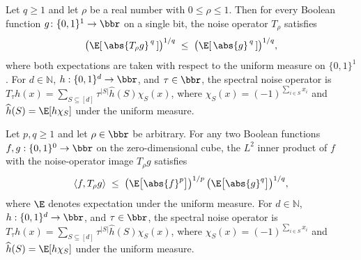 \begin{lemma}
\leanok
{}
\label{BooleanAnalysis.Hypercontractivity.noise_Lp_contraction_one_bit}
Let $q \ge 1$ and let $\rho$ be a real number with $0 \le \rho \le 1$. Then for every
Boolean function $g \colon \{0,1\}^1 \to \bbr$ on a single bit, the noise operator
$T_\rho$ satisfies
\[
  \bigl(\E\!\left[\,\abs{T_\rho g}^{\,q}\,\right]\bigr)^{1/q}
  \;\le\;
  \bigl(\E\!\left[\,\abs{g}^{\,q}\,\right]\bigr)^{1/q},
\]
where both expectations are taken with respect to the uniform measure on $\{0,1\}^1$.
For $d\in\mathbb N$, $h:\{0,1\}^d\to\bbr$, and $\tau\in\bbr$, the spectral noise
operator is $T_\tau h(x)=\sum_{S\subseteq[d]}\tau^{|S|}\widehat h(S)\chi_S(x)$, where
$\chi_S(x)=(-1)^{\sum_{i\in S}x_i}$ and $\widehat h(S)=\E[h\chi_S]$ under the uniform
measure.
\end{lemma}

\begin{lemma}
\leanok
{}
\label{BooleanAnalysis.Hypercontractivity.two_func_hyp_zero}
Let $p, q \ge 1$ and let $\rho \in \bbr$ be arbitrary. For any two Boolean functions $f,
g : \{0,1\}^0 \to \bbr$ on the zero-dimensional cube, the $L^2$ inner product of $f$
with the noise-operator image $T_\rho g$ satisfies
\[
\langle f, T_\rho g\rangle \;\le\;
\bigl(\E\bigl[\abs{f}^p\bigr]\bigr)^{1/p}\,\bigl(\E\bigl[\abs{g}^q\bigr]\bigr)^{1/q},
\]
where $\E$ denotes expectation under the uniform measure. For $d\in\mathbb N$,
$h:\{0,1\}^d\to\bbr$, and $\tau\in\bbr$, the spectral noise operator is $T_\tau
h(x)=\sum_{S\subseteq[d]}\tau^{|S|}\widehat h(S)\chi_S(x)$, where
$\chi_S(x)=(-1)^{\sum_{i\in S}x_i}$ and $\widehat h(S)=\E[h\chi_S]$ under the uniform
measure.
\end{lemma}

